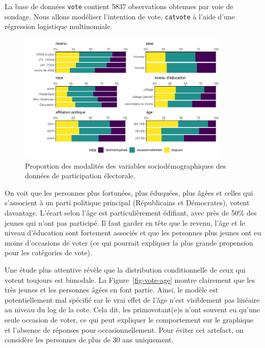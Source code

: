 \documentclass[
  11pt,
  letterpaper,
]{scrbook}
\theoremstyle{definition}
\theoremstyle{remark}
\begin{document}
La base de données \texttt{vote} contient 5837 observations obtenues par
voie de sondage. Nous allons modéliser l'intention de vote,
\texttt{catvote} à l'aide d'une régression logistique multinomiale.

\begin{figure}[ht!]

{\centering \includegraphics[width=0.9\textwidth,height=\textheight]{reglogistique_files/figure-pdf/fig-multinom_means-Ipsos-1.pdf}

}

\caption{\label{fig-multinom_means-Ipsos}Proportion des modalités des
variables sociodémographiques des données de participation électorale.}

\end{figure}

On voit que les personnes plus fortunées, plus éduquées, plus âgées et
celles qui s'associent à un parti politique principal (Républicains et
Démocrates), votent davantage. L'écart selon l'âge est particulièrement
édifiant, avec près de 50\% des jeunes qui n'ont pas participé. Il faut
garder en tête que le revenu, l'âge et le niveau d'éducation sont
fortement associés et que les personnes plus jeunes ont eu moins
d'occasions de voter (ce qui pourrait expliquer la plus grande
propension pour les catégories de vote).

Une étude plus attentive révèle que la distribution conditionnelle de
ceux qui votent toujours est bimodale. La Figure~\ref{fig-vote-age}
montre clairement que les très jeunes et les personnes âgées en font
partie. Ainsi, le modèle est potentiellement mal spécifié car le vrai
effet de l'âge n'est visiblement pas linéaire au niveau du log de la
cote. Cela dit, les primovotant(e)s n'ont souvent eu qu'une seule
occasion de voter, ce qui peut expliquer le comportement sur le
graphique et l'absence de réponses pour occasionnellement. Pour éviter
cet artefact, on considère les personnes de plus de 30 ans uniquement.
\end{document}

